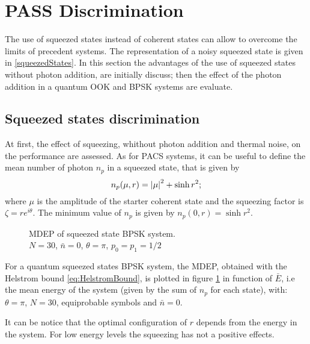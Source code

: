 \section{PASS Discrimination}
    The use of squeezed states instead of coherent states can allow to overcome the limits
    of precedent systems. The representation of a noisy squeezed state is given in 
    \ref{squeezedStates}. In this section the advantages of the use of squeezed states 
    without photon addition, are initially discuss; then the effect of the photon addition
    in a quantum OOK and BPSK systems are evaluate.

    \subsection{Squeezed states discrimination}
        At first, the effect of squeezing, whithout photon addition and thermal noise, on the
        performance are assessed. As for PACS systems, it can be useful to define the mean 
        number of photon $n_p$ in a squeezed state, that is given by
        \begin{equation}
            n_p(\mu,r) = \absolutevalue{\mu}^2 + \sinh{r}^2;
        \end{equation}
        where $\mu$ is the amplitude of the starter coherent state and the squeezing factor
        is $\zeta = r e^{i\theta}$. The minimum value of $n_p$ is given by $n_p(0,r) = \sinh{r}^2$.

        \begin{figure}[ht]
            \caption{MDEP of squeezed state BPSK system.\\
            $N=30$, $\bar{n}=0$, $\theta=\pi$, $p_0=p_1=1/2$}
            \label{fig:3.5}
        \end{figure}
        For a quantum squeezed states BPSK system, the MDEP, obtained with the Helstrom bound 
        \ref{eq:HelstromBound}, is plotted in figure \ref{fig:3.5} in function of $\bar{E}$,
        i.e the mean energy of the system (given by the sum of $n_p$ for each state), with:
        $\theta=\pi$, $N=30$, equiprobable symbols and $\bar{n}=0$.

        It can be notice that the optimal configuration of $r$ depends from the energy in the 
        system. For low energy levels the squeezing has not a positive effects.